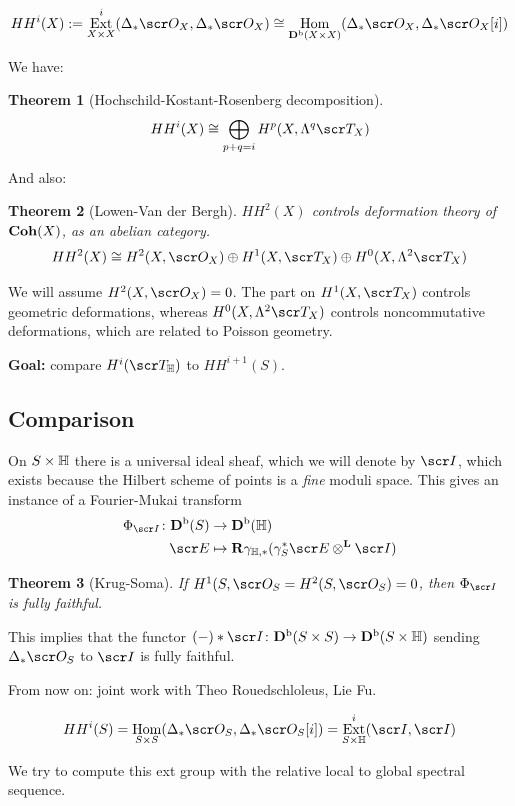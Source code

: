 \documentclass[A4paper, british, reqno]{amsart}
\theoremstyle{darkgreentheorem}
\newtheorem{thm}{Theorem}[section]
\theoremstyle{darkbluedefinition}
\theoremstyle{darkredexample}
\theoremstyle{remark}
\DeclareMathOperator{\Hom}{Hom}
\DeclareMathOperator{\Ext}{Ext}
\newcommand{\HH}{HH}
\newcommand{\1}{\mathbbm{1}}
\newcommand{\ot}{\otimes}
\newcommand{\op}{\oplus}
\newcommand{\tms}{\times}
\begin{document}
\[ \HH^{i}(X):=\Ext^{i}_{X\times X}(\Delta_{*}\O_{X},\Delta_{*}\O_{X})\cong \Hom_{\Db(X\times X)}(\Delta_{*}\O_{X},\Delta_{*}\O_{X}[i]) \]

We have:
\begin{thm}[Hochschild-Kostant-Rosenberg decomposition]
    \[ \HH^{i}(X)\cong \bigoplus_{p+q=i}H^{p}(X,\Lambda^{q}\sT_{X}) \]
\end{thm}

And also:
\begin{thm}[Lowen-Van der Bergh]
    $\HH^{2}(X)$ controls deformation theory of $\mathbf{Coh}(X)$, as an abelian category.
    \[ \HH^{2}(X)\cong H^{2}(X,\O_{X})\op H^{1}(X,\sT_{X})\op H^{0}(X,\Lambda^{2}\sT_{X}) \]
\end{thm}

We will assume $H^{2}(X,\O_{X})=0$.
The part on $H^{1}(X,\sT_{X})$ controls geometric deformations, whereas $H^{0}(X,\Lambda^{2}\sT_{X})$ controls noncommutative deformations, which are related to Poisson geometry.

\textbf{Goal:} compare $H^{i}(\sT_{\bbH})$ to $\HH^{i+1}(S)$.

\subsection{Comparison}

On $S\times \mathbb{H}$ there is a universal ideal sheaf, which we will denote by $\I$, which exists because the Hilbert scheme of points is a \textit{fine} moduli space.
This gives an instance of a Fourier-Mukai transform
\begin{align*}
    \Phi_{\I}\colon \Db(S) & \to \Db(\bbH) \\
    \E & \mapsto \bfR \gamma_{\bbH,*}(\gamma_{S}^{*}\E\ot^{\bfL}\I) 
\end{align*}

\begin{thm}[Krug-Soma]
    If $H^{1}(S,\O_{S}=H^{2}(S,\O_{S})=0$, then $\Phi_{\I}$ is fully faithful.
\end{thm}

This implies that the functor $(-)*\I\colon \Db(S\tms S)\to \Db(S\tms \bbH)$ sending $\Delta_{*}\O_{S}$ to $\I$ is fully faithful.

From now on: joint work with Theo Rouedschloleus, Lie Fu.

\[ \HH^{i}(S)=\Hom_{S\times S}(\Delta_{*}\O_{S},\Delta_{*}\O_{S}[i])=\Ext^{i}_{S\times \bbH}(\I,\I) \]

We try to compute this ext group with the relative local to global spectral sequence.
\end{document}

